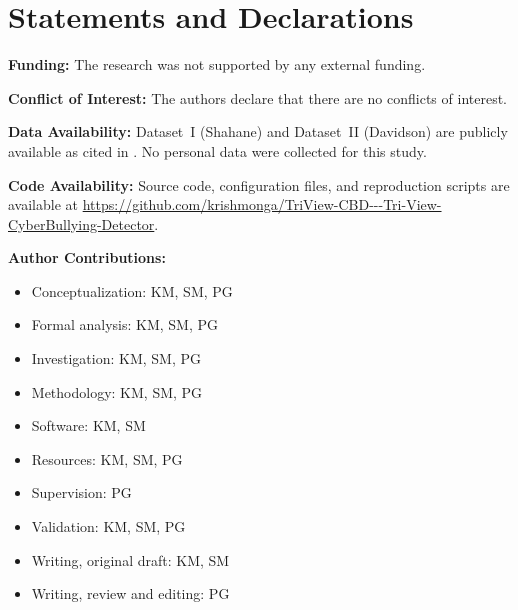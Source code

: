 \documentclass[journal]{IEEEtran}
\begin{document}
\section*{Statements and Declarations}





\textbf{Funding:} The research was not supported by any external funding.

\textbf{Conflict of Interest:} The authors declare that there are no conflicts of interest.

\textbf{Data Availability:} Dataset~I (Shahane) and Dataset~II (Davidson) are publicly available as cited in \cite{ref10,ref11}. No personal data were collected for this study.

\textbf{Code Availability:} Source code, configuration files, and reproduction scripts are available at \url{https://github.com/krishmonga/TriView-CBD---Tri-View-CyberBullying-Detector}.

\textbf{Author Contributions:}
\begin{itemize}
    \item Conceptualization: KM, SM, PG
    \item Formal analysis: KM, SM, PG
    \item Investigation: KM, SM, PG
    \item Methodology: KM, SM, PG
    \item Software: KM, SM
    \item Resources: KM, SM, PG
    \item Supervision: PG
    \item Validation: KM, SM, PG
    \item Writing, original draft: KM, SM
    \item Writing, review and editing: PG
\end{itemize}
\end{document}
